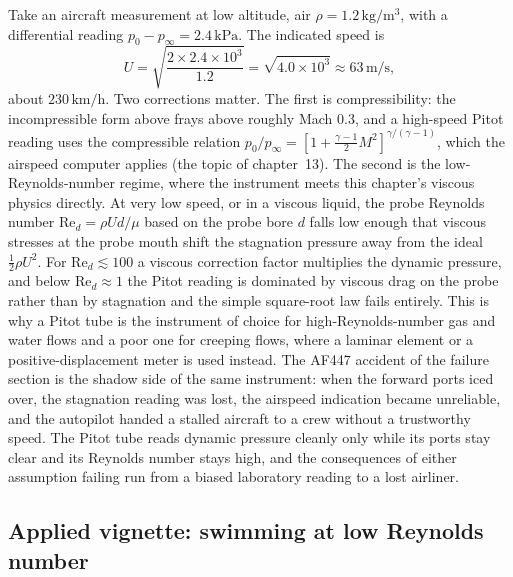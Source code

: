 Take an aircraft measurement at low altitude, air $\rho = 1.2\,\si{
\kilogram\per\meter\cubed}$, with a differential reading $p_0 -
p_\infty = 2.4\,\si{\kilo\pascal}$. The indicated speed is
\[
U = \sqrt{\frac{2\times2.4\times10^{3}}{1.2}} = \sqrt{4.0\times10^{3}}
\approx 63\,\si{\meter\per\second},
\]
about $230\,\text{km/h}$. Two corrections matter. The first is
compressibility: the incompressible form above frays above roughly Mach
$0.3$, and a high-speed Pitot reading uses the compressible relation
$p_0/p_\infty = [1 + \tfrac{\gamma-1}{2}M^2]^{\gamma/(\gamma-1)}$,
which the airspeed computer applies (the topic of chapter~13). The
second is the low-Reynolds-number regime, where the instrument meets
this chapter's viscous physics directly. At very low speed, or in a
viscous liquid, the probe Reynolds number $\text{Re}_d = \rho U d/\mu$
based on the probe bore $d$ falls low enough that viscous stresses at
the probe mouth shift the stagnation pressure away from the ideal
$\tfrac12\rho U^2$. For $\text{Re}_d \lesssim 100$ a viscous
correction factor multiplies the dynamic pressure, and below
$\text{Re}_d\approx1$ the Pitot reading is dominated by viscous drag on
the probe rather than by stagnation and the simple square-root law
fails entirely. This is why a Pitot tube is the instrument of choice
for high-Reynolds-number gas and water flows and a poor one for
creeping flows, where a laminar element or a positive-displacement
meter is used instead. The AF447 accident of the failure section is the
shadow side of the same instrument: when the forward ports iced over,
the stagnation reading was lost, the airspeed indication became
unreliable, and the autopilot handed a stalled aircraft to a crew
without a trustworthy speed. The Pitot tube reads dynamic pressure
cleanly only while its ports stay clear and its Reynolds number stays
high, and the consequences of either assumption failing run from a
biased laboratory reading to a lost airliner.



\subsection*{Applied vignette: swimming at low Reynolds number}

